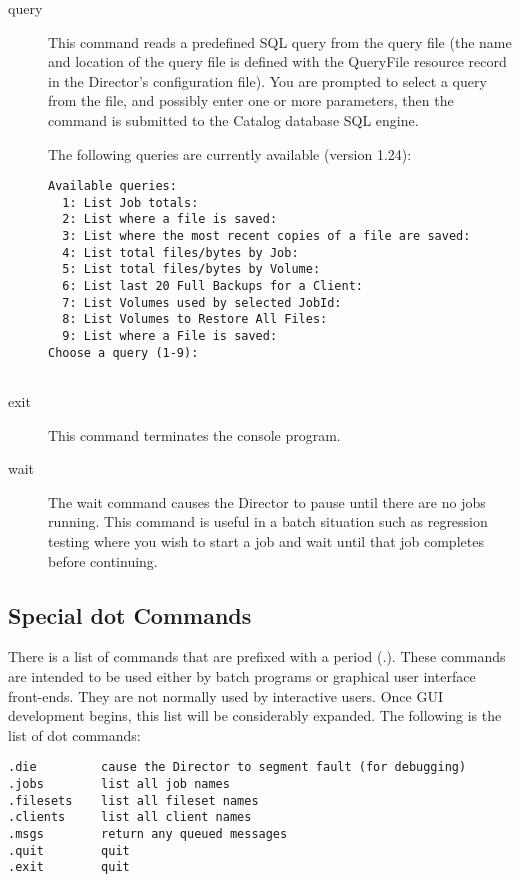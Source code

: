 \begin{description}
\item [query]
   This command reads a predefined SQL query from  the query file (the name and
location of the  query file is defined with the QueryFile resource record in 
the Director's configuration file). You are prompted to select  a query from
the file, and possibly enter one or more parameters,  then the command is
submitted to the Catalog database SQL engine.  

The following queries are currently available (version 1.24):  

\footnotesize
\begin{verbatim}
Available queries:
  1: List Job totals:
  2: List where a file is saved:
  3: List where the most recent copies of a file are saved:
  4: List total files/bytes by Job:
  5: List total files/bytes by Volume:
  6: List last 20 Full Backups for a Client:
  7: List Volumes used by selected JobId:
  8: List Volumes to Restore All Files:
  9: List where a File is saved:
Choose a query (1-9):
      
\end{verbatim}
\normalsize

\item [exit]
   This command terminates the console program.  

\item [wait]
   The wait command causes the Director to pause  until there are no jobs
running. This command is useful in  a batch situation such as regression
testing where you  wish to start a job and wait until that job completes 
before continuing. 
\end{description}

\label{dotcommands}

\subsection*{Special dot Commands}

There is a list of commands that are prefixed with a period (.). These
commands are intended to be used either by batch programs or graphical user
interface front-ends. They are not normally used by interactive users. Once
GUI development begins, this list will be considerably expanded. The following
is the list of dot commands: 

\footnotesize
\begin{verbatim}
.die         cause the Director to segment fault (for debugging)
.jobs        list all job names
.filesets    list all fileset names
.clients     list all client names
.msgs        return any queued messages
.quit        quit
.exit        quit
\end{verbatim}
\normalsize

